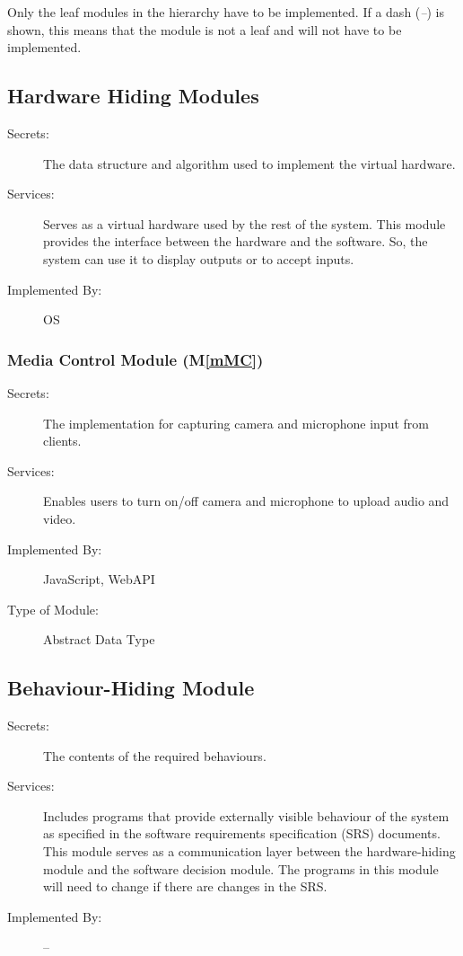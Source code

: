 \documentclass[12pt, titlepage]{article}
\newcommand{\mref}[1]{M\ref{#1}}
\begin{document}
Only the leaf modules in the hierarchy have to be implemented. If a dash
(\emph{--}) is shown, this means that the module is not a leaf and will not have
to be implemented.

\subsection{Hardware Hiding Modules}

\begin{description}
\item[Secrets:]The data structure and algorithm used to implement the virtual
  hardware.
\item[Services:]Serves as a virtual hardware used by the rest of the
  system. This module provides the interface between the hardware and the
  software. So, the system can use it to display outputs or to accept inputs.
\item[Implemented By:] OS
\end{description}

\subsubsection{Media Control Module (\mref{mMC})}

\begin{description}
\item[Secrets:]The implementation for capturing camera and microphone input from clients.
\item[Services:]Enables users to turn on/off camera and microphone to upload audio and video.
\item[Implemented By:] JavaScript, WebAPI
\item[Type of Module:] Abstract Data Type
\end{description}

\subsection{Behaviour-Hiding Module}

\begin{description}
\item[Secrets:]The contents of the required behaviours.
\item[Services:]Includes programs that provide externally visible behaviour of
  the system as specified in the software requirements specification (SRS)
  documents. This module serves as a communication layer between the
  hardware-hiding module and the software decision module. The programs in this
  module will need to change if there are changes in the SRS.
\item[Implemented By:] --
\end{description}
\end{document}
